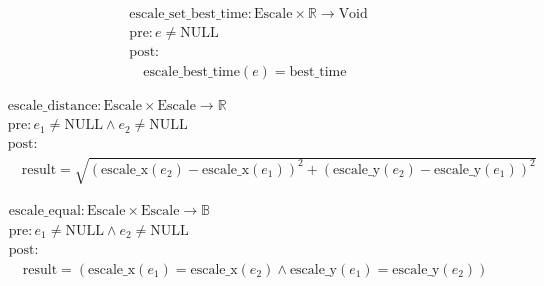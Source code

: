 \[
\begin{aligned}
&\text{escale\_set\_best\_time}: \text{Escale} \times \mathbb{R} \to \text{Void} \\
&\text{pre}: e \neq \text{NULL} \\
&\text{post}: \\
&\quad \text{escale\_best\_time}(e) = \text{best\_time}
\end{aligned}
\]





\[
\begin{aligned}
&\text{escale\_distance}: \text{Escale} \times \text{Escale} \to \mathbb{R} \\
&\text{pre}: e_1 \neq \text{NULL} \land e_2 \neq \text{NULL} \\
&\text{post}: \\
&\quad \text{result} = \sqrt{(\text{escale\_x}(e_2) - \text{escale\_x}(e_1))^2 + (\text{escale\_y}(e_2) - \text{escale\_y}(e_1))^2}
\end{aligned}
\]





\[
\begin{aligned}
&\text{escale\_equal}: \text{Escale} \times \text{Escale} \to \mathbb{B} \\
&\text{pre}: e_1 \neq \text{NULL} \land e_2 \neq \text{NULL} \\
&\text{post}: \\
&\quad \text{result} = (\text{escale\_x}(e_1) = \text{escale\_x}(e_2) \land \text{escale\_y}(e_1) = \text{escale\_y}(e_2))
\end{aligned}
\]
